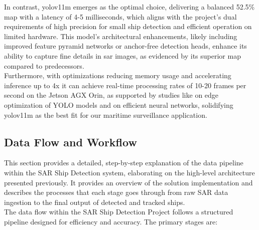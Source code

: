 \documentclass{article}
\begin{document}
	In contrast, \acrshort{yolov11m} emerges as the optimal choice, delivering a balanced 52.5\% \acrshort{map} with a latency of 4-5 milliseconds, which aligns with the project’s dual requirements of high precision for small ship detection and efficient operation on limited hardware. This model’s architectural enhancements, likely including improved feature pyramid networks or anchor-free detection heads, enhance its ability to capture fine details in \acrshort{sar} images, as evidenced by its superior \acrshort{map} compared to predecessors.\\
	
	Furthermore, with optimizations reducing memory usage and accelerating inference up to 4x it can achieve real-time processing rates of 10-20 frames per second on the Jetson AGX Orin, as supported by studies like \cite{rasheed2025yolov11} on edge optimization of YOLO models and \cite{en15238816} on efficient neural networks, solidifying \acrshort{yolov11m} as the best fit for our maritime surveillance application. 
	
	\subsection{Data Flow and Workflow}
	This section provides a detailed, step-by-step explanation of the data pipeline within the SAR Ship Detection system, elaborating on the high-level architecture presented previously. It provides an overview of the solution implementation and describes the processes that each stage goes through from raw SAR data ingestion to the final output of detected and tracked ships.\\
	
	The data flow within the SAR Ship Detection Project follows a structured pipeline designed for efficiency and accuracy. The primary stages are:
	
\end{document}

